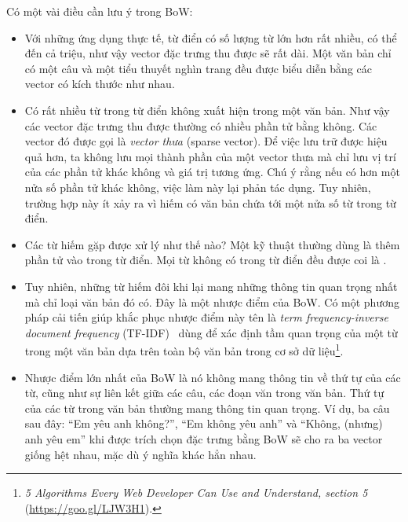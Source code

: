 Có một vài điều cần lưu ý trong BoW:
\begin{itemize}
\item Với những ứng dụng thực tế, {từ điển} có số lượng từ lớn hơn rất
nhiều, có thể đến cả triệu, như vậy vector đặc trưng thu được sẽ rất dài.
Một văn bản chỉ có một câu và một tiểu thuyết nghìn trang đều được biểu
diễn bằng các vector có kích thước như nhau.

\item Có rất nhiều từ trong từ điển không xuất hiện trong một văn bản. Như
vậy các vector đặc trưng thu được thường có nhiều phần tử bằng không.
Các vector đó được gọi là \textit{vector thưa} (sparse vector). Để việc lưu trữ được hiệu quả hơn, ta không lưu mọi thành phần của một
vector thưa mà chỉ lưu {vị trí} của các phần tử khác không và {giá
trị} tương ứng. Chú ý rằng nếu có hơn một nửa số phần tử khác không, việc
làm này lại phản tác dụng. Tuy nhiên, trường hợp này ít xảy ra vì hiếm có
văn bản chứa tới một nửa số từ trong từ điển.

\item Các từ hiếm gặp được xử lý như thế nào? Một kỹ thuật thường dùng là
thêm phần tử  vào trong từ điển. Mọi từ không có
trong từ điển đều được coi là
.

\item Tuy nhiên, những từ hiếm đôi khi lại mang những thông tin quan
trọng nhất mà chỉ loại văn bản đó có. Đây là một nhược điểm của BoW. Có một
phương pháp cải tiến giúp khắc phục nhược điểm này tên là \textit{term
frequency-inverse document frequency} (TF-IDF)~\cite{salton1975vector} dùng
để xác định tầm quan trọng của một từ trong một văn bản dựa trên toàn bộ văn
bản trong cơ sở dữ liệu\footnote{\textit{5 Algorithms Every Web Developer
Can Use and Understand, section 5} (\url{https://goo.gl/LJW3H1}).}.

\item Nhược điểm lớn nhất của BoW là nó không mang thông tin về thứ tự của
các từ, cũng như sự liên kết giữa các câu, các đoạn văn trong văn bản. Thứ
tự của các từ trong văn bản thường mang thông tin quan trọng. Ví dụ, ba câu
sau đây: ``Em yêu anh không?'', ``Em không yêu anh'' và ``Không, (nhưng)
anh yêu em'' khi được trích chọn đặc trưng bằng BoW sẽ cho ra ba vector
giống hệt nhau, mặc dù ý nghĩa khác hẳn nhau.
\end{itemize}



